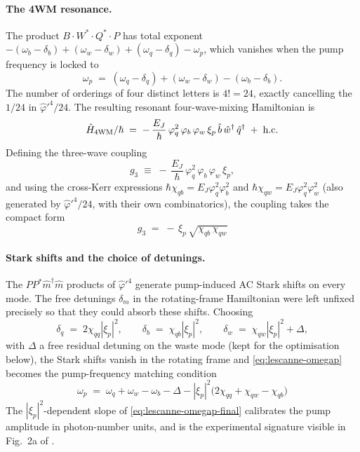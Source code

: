\paragraph{The 4WM resonance.}
The product $B\cdot W^*\cdot Q^*\cdot P$ has total exponent
$-(\omega_b-\delta_b)+(\omega_w-\delta_w)+(\omega_q-\delta_q)-\omega_p$,
which vanishes when the pump frequency is locked to
\begin{equation}
\label{eq:lescanne-omegap}
\omega_p \;=\; (\omega_q-\delta_q)+(\omega_w-\delta_w)-(\omega_b-\delta_b).
\end{equation}
The number of orderings of four distinct letters is $4!=24$,
exactly cancelling the $1/24$ in $\hat\varphi'^4/24$. The resulting
resonant four-wave-mixing Hamiltonian is
\begin{equation}
\label{eq:lescanne-H4WM}
\hat{H}_{\rm 4WM}/\hbar
\;=\; -\,\frac{E_J}{\hbar}\,\varphi_q^2\,\varphi_b\,\varphi_w\,\xi_p\,
\hat b\,\hat w^\dagger\,\hat q^\dagger
\;+\; \hbox{h.c.}
\end{equation}
Defining the three-wave coupling
\begin{equation}
\label{eq:lescanne-g3}
g_3 \;\equiv\; -\,\frac{E_J}{\hbar}\,\varphi_q^2\,\varphi_b\,\varphi_w\,\xi_p,
\end{equation}
and using the cross-Kerr expressions
$\hbar\chi_{qb}=E_J\varphi_q^2\varphi_b^2$ and
$\hbar\chi_{qw}=E_J\varphi_q^2\varphi_w^2$ (also generated by
$\hat\varphi'^4/24$, with their own combinatorics), the coupling
takes the compact form
\begin{equation}
\label{eq:lescanne-g3-chi}
\boxed{\;g_3 \;=\; -\,\xi_p\,\sqrt{\chi_{qb}\,\chi_{qw}}\;}
\end{equation}

\paragraph{Stark shifts and the choice of detunings.}
The $PP^*\hat m^\dagger\hat m$ products of $\hat\varphi'^4$ generate
pump-induced AC Stark shifts on every mode. The free detunings
$\delta_m$ in the rotating-frame Hamiltonian were left unfixed
precisely so that they could absorb these shifts. Choosing
\begin{equation}
\delta_q \;=\; 2\chi_{qq}|\xi_p|^2,\qquad
\delta_b \;=\; \chi_{qb}|\xi_p|^2,\qquad
\delta_w \;=\; \chi_{qw}|\xi_p|^2 + \Delta,
\end{equation}
with $\Delta$ a free residual detuning on the waste mode (kept for
the optimisation below), the Stark shifts vanish in the rotating
frame and \cref{eq:lescanne-omegap} becomes the pump-frequency
matching condition
\begin{equation}
\label{eq:lescanne-omegap-final}
\boxed{\;\omega_p \;=\; \omega_q+\omega_w-\omega_b - \Delta
- |\xi_p|^2\bigl(2\chi_{qq}+\chi_{qw}-\chi_{qb}\bigr)\;}
\end{equation}
The $|\xi_p|^2$-dependent slope of \cref{eq:lescanne-omegap-final}
calibrates the pump amplitude in photon-number units, and is the
experimental signature visible in Fig.~2a of \cite{lescanne2020}.

